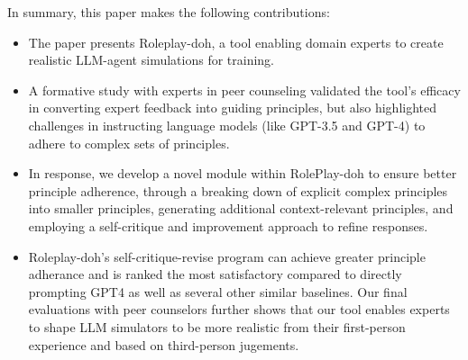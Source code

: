 In summary, this paper makes the following contributions:
\begin{itemize}
    \item The paper presents Roleplay-doh, a tool enabling domain experts to create realistic LLM-agent simulations for training.
    \item A formative study with experts in peer counseling validated the tool's efficacy in converting expert feedback into guiding principles, but also highlighted challenges in instructing language models (like GPT-3.5 and GPT-4) to adhere to complex sets of principles.
    \item In response, we develop a novel module within RolePlay-doh to ensure better principle adherence, through a breaking down of explicit complex principles into smaller principles, generating additional context-relevant principles, and employing a self-critique and improvement approach to refine responses. 
    \item Roleplay-doh's self-critique-revise program can achieve greater principle adherance and is ranked the most satisfactory compared to directly prompting GPT4 as well as several other similar baselines. Our final evaluations with peer counselors further shows that our tool enables experts to shape LLM simulators to be more realistic from their first-person experience and based on third-person jugements.
\end{itemize}


